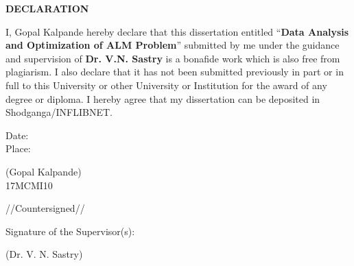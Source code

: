 \begin{center}
\textbf{\large DECLARATION}
\end{center}
\vspace{.50in}
I, Gopal Kalpande hereby declare that this dissertation entitled 
``\textbf{Data Analysis and Optimization of ALM Problem}'' 
submitted by me under the guidance and supervision of \textbf{Dr. V.N. Sastry} is a bonafide work which is also free from plagiarism. 
I also declare that it has not been submitted previously in part or in full to this University or other University or Institution for the award of any degree or diploma. I hereby agree that my dissertation can be deposited in Shodganga/INFLIBNET.

\vspace{1in}

\noindent
\parbox[t]{3in}
{\raggedright
Date:\\
Place:\\
}
\parbox[t]{3in}
{
\raggedleft 
(Gopal Kalpande)\\
17MCMI10\\
}
        \vspace*{2.5cm}\centerline{//Countersigned//}

        \noindent%
        Signature of the Supervisor(s):

        \vspace*{1.5cm}\noindent(Dr. V. N. Sastry)
        

